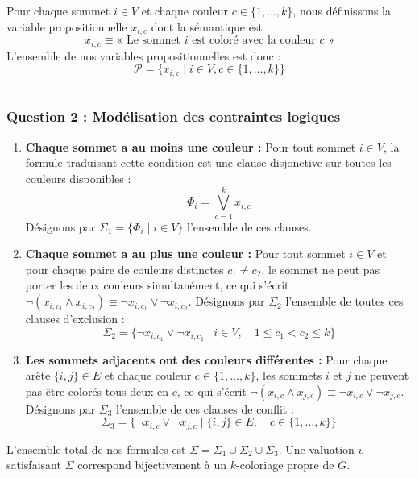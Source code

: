 \documentclass[11pt,a4paper]{article}
\begin{document}
Pour chaque sommet \(i \in V\) et chaque couleur
\(c \in \{1, \dots, k\}\), nous définissons la variable propositionnelle
\(x_{i, c}\) dont la sémantique est :
\[x_{i, c} \equiv \text{« Le sommet } i \text{ est coloré avec la couleur } c \text{ »}\]
L'ensemble de nos variables propositionnelles est donc :
\[\mathcal{P} = \{x_{i, c} \mid i \in V, c \in \{1, \dots, k\}\}\]

\begin{center}\rule{0.5\linewidth}{0.5pt}\end{center}

\hypertarget{question-2-moduxe9lisation-des-contraintes-logiques}{%
\subsubsection{Question 2 : Modélisation des contraintes
logiques}\label{question-2-moduxe9lisation-des-contraintes-logiques}}

\begin{enumerate}
\def\labelenumi{\arabic{enumi}.}
\item
  \textbf{Chaque sommet a au moins une couleur :} Pour tout sommet
  \(i \in V\), la formule traduisant cette condition est une clause
  disjonctive sur toutes les couleurs disponibles :
  \[\Phi_i = \bigvee_{c=1}^k x_{i, c}\] Désignons par
  \(\Sigma_1 = \{\Phi_i \mid i \in V\}\) l'ensemble de ces clauses.
\item
  \textbf{Chaque sommet a au plus une couleur :} Pour tout sommet
  \(i \in V\) et pour chaque paire de couleurs distinctes
  \(c_1 \neq c_2\), le sommet ne peut pas porter les deux couleurs
  simultanément, ce qui s'écrit
  \(\neg(x_{i, c_1} \land x_{i, c_2}) \equiv \neg x_{i, c_1} \lor \neg x_{i, c_2}\).
  Désignons par \(\Sigma_2\) l'ensemble de toutes ces clauses
  d'exclusion :
  \[\Sigma_2 = \{\neg x_{i, c_1} \lor \neg x_{i, c_2} \mid i \in V, \quad 1 \le c_1 < c_2 \le k\}\]
\item
  \textbf{Les sommets adjacents ont des couleurs différentes :} Pour
  chaque arête \(\{i, j\} \in E\) et chaque couleur
  \(c \in \{1, \dots, k\}\), les sommets \(i\) et \(j\) ne peuvent pas
  être colorés tous deux en \(c\), ce qui s'écrit
  \(\neg(x_{i, c} \land x_{j, c}) \equiv \neg x_{i, c} \lor \neg x_{j, c}\).
  Désignons par \(\Sigma_3\) l'ensemble de ces clauses de conflit :
  \[\Sigma_3 = \{\neg x_{i, c} \lor \neg x_{j, c} \mid \{i, j\} \in E, \quad c \in \{1, \dots, k\}\}\]
\end{enumerate}

L'ensemble total de nos formules est
\(\Sigma = \Sigma_1 \cup \Sigma_2 \cup \Sigma_3\). Une valuation \(v\)
satisfaisant \(\Sigma\) correspond bijectivement à un \(k\)-coloriage
propre de \(G\).
\end{document}
